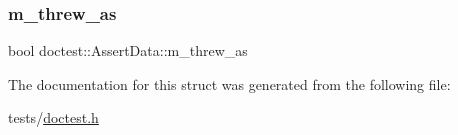 \subsubsection{\texorpdfstring{m\+\_\+threw\+\_\+as}{m\_threw\_as}}
{\footnotesize\ttfamily bool doctest\+::\+Assert\+Data\+::m\+\_\+threw\+\_\+as}



The documentation for this struct was generated from the following file\+:\begin{DoxyCompactItemize}
\item 
tests/\hyperlink{doctest_8h}{doctest.\+h}\end{DoxyCompactItemize}
